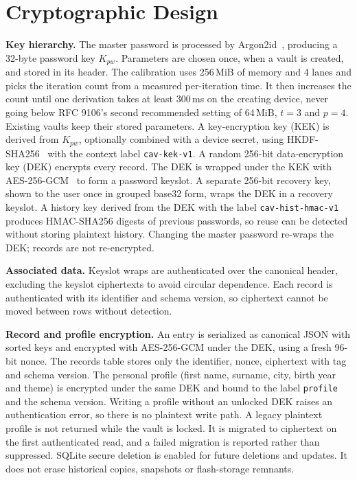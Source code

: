 \documentclass[preprint,12pt]{elsarticle}
\begin{document}
\section{Cryptographic Design}
\textbf{Key hierarchy.} The master password is processed by Argon2id~\cite{rfc9106}, producing a 32-byte password key $K_{pw}$. Parameters are chosen once, when a vault is created, and stored in its header. The calibration uses 256\,MiB of memory and 4 lanes and picks the iteration count from a measured per-iteration time. It then increases the count until one derivation takes at least 300\,ms on the creating device, never going below RFC 9106's second recommended setting of 64\,MiB, $t=3$ and $p=4$. Existing vaults keep their stored parameters. A key-encryption key (KEK) is derived from $K_{pw}$, optionally combined with a device secret, using HKDF-SHA256~\cite{rfc5869} with the context label \texttt{cav-kek-v1}. A random 256-bit data-encryption key (DEK) encrypts every record. The DEK is wrapped under the KEK with AES-256-GCM~\cite{gcm} to form a password keyslot. A separate 256-bit recovery key, shown to the user once in grouped base32 form, wraps the DEK in a recovery keyslot. A history key derived from the DEK with the label \texttt{cav-hist-hmac-v1} produces HMAC-SHA256 digests of previous passwords, so reuse can be detected without storing plaintext history. Changing the master password re-wraps the DEK; records are not re-encrypted.

\textbf{Associated data.} Keyslot wraps are authenticated over the canonical header, excluding the keyslot ciphertexts to avoid circular dependence. Each record is authenticated with its identifier and schema version, so ciphertext cannot be moved between rows without detection.

\textbf{Record and profile encryption.} An entry is serialized as canonical JSON with sorted keys and encrypted with AES-256-GCM under the DEK, using a fresh 96-bit nonce. The records table stores only the identifier, nonce, ciphertext with tag and schema version. The personal profile (first name, surname, city, birth year and theme) is encrypted under the same DEK and bound to the label \texttt{profile} and the schema version. Writing a profile without an unlocked DEK raises an authentication error, so there is no plaintext write path. A legacy plaintext profile is not returned while the vault is locked. It is migrated to ciphertext on the first authenticated read, and a failed migration is reported rather than suppressed. SQLite secure deletion is enabled for future deletions and updates. It does not erase historical copies, snapshots or flash-storage remnants.
\end{document}
